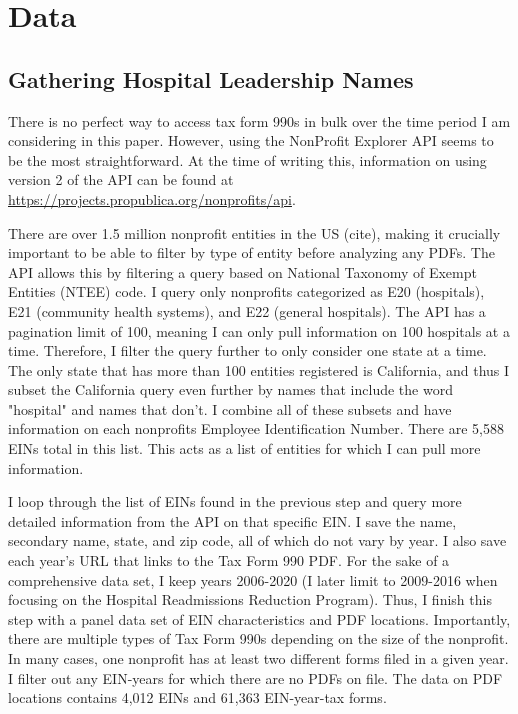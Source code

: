 \documentclass[12pt]{article}
\begin{document}
\appendix

 \section{Data}\label{appendixdata}

\subsection{Gathering Hospital Leadership Names}

There is no perfect way to access tax form 990s in bulk over the time period I am considering in this paper. However, using the NonProfit Explorer API seems to be the most straightforward. At the time of writing this, information on using version 2 of the API can be found at \hyperlink{https://projects.propublica.org/nonprofits/api}{https://projects.propublica.org/nonprofits/api}. 
    
There are over 1.5 million nonprofit entities in the US (cite), making it crucially important to be able to filter by type of entity before analyzing any PDFs. The API allows this by filtering a query based on National Taxonomy of Exempt Entities (NTEE) code. I query only nonprofits categorized as E20 (hospitals), E21 (community health systems), and E22 (general hospitals). The API has a pagination limit of 100, meaning I can only pull information on 100 hospitals at a time. Therefore, I filter the query further to only consider one state at a time. The only state that has more than 100 entities registered is California, and thus I subset the California query even further by names that include the word "hospital" and names that don't. I combine all of these subsets and have information on each nonprofits Employee Identification Number. There are 5,588 EINs total in this list. This acts as a list of entities for which I can pull more information. 

I loop through the list of EINs found in the previous step and query more detailed information from the API on that specific EIN. I save the name, secondary name, state, and zip code, all of which do not vary by year. I also save each year's URL that links to the Tax Form 990 PDF. For the sake of a comprehensive data set, I keep years 2006-2020 (I later limit to 2009-2016 when focusing on the Hospital Readmissions Reduction Program). Thus, I finish this step with a panel data set of EIN characteristics and PDF locations. Importantly, there are multiple types of Tax Form 990s depending on the size of the nonprofit. In many cases, one nonprofit has at least two different forms filed in a given year. I filter out any EIN-years for which there are no PDFs on file. The data on PDF locations contains 4,012 EINs and 61,363 EIN-year-tax forms.
\end{document}
